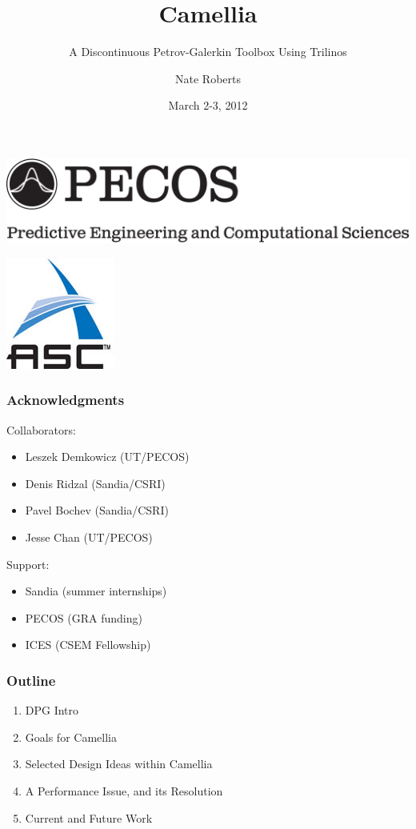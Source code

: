 \documentclass[mathserif]{beamer}
\date{March 2-3, 2012}
\author{Nate Roberts}
\institute{The University of Texas at Austin}
\title[Camellia]{Camellia}
\subtitle{A Discontinuous Petrov-Galerkin Toolbox Using Trilinos}
\begin{document}
\begin{frame}
\begin{center}
\includegraphics[width=.8\linewidth]{grand_logo}\\
\end{center}
\titlepage
\begin{flushright}
\includegraphics[scale=0.1]{asc_logo}\\
\end{flushright}
\end{frame}

\begin{frame}
\frametitle{Acknowledgments}

Collaborators:
\begin{itemize}
\item Leszek Demkowicz (UT/PECOS)
\item Denis Ridzal (Sandia/CSRI)
\item Pavel Bochev (Sandia/CSRI)
\item Jesse Chan (UT/PECOS)
\end{itemize}

Support:
\begin{itemize}
\item Sandia (summer internships)
\item PECOS (GRA funding)
\item ICES (CSEM Fellowship)
\end{itemize}

\end{frame}


\begin{frame}
\frametitle{Outline}

\begin{enumerate}
\item DPG Intro
\item Goals for Camellia
\item Selected Design Ideas within Camellia
\item A Performance Issue, and its Resolution
\item Current and Future Work
\end{enumerate}

\end{frame}
\end{document}

